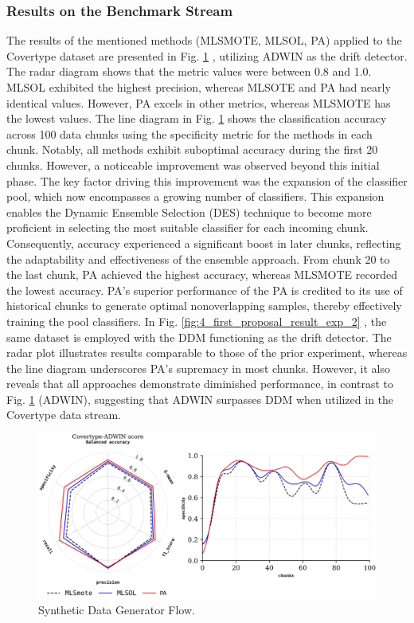 \subsubsection{Results on the Benchmark Stream}
The results of the mentioned methods (MLSMOTE, MLSOL, PA) applied to the Covertype dataset are presented in Fig. \ref{fig:4_first_proposal_result_exp_1}
, utilizing ADWIN as the drift detector. The radar diagram shows that the metric values were between 0.8 and 1.0. MLSOL exhibited the highest precision, whereas MLSOTE and PA had nearly identical values. However, PA excels in other metrics, whereas MLSMOTE has the lowest values. The line diagram in Fig. \ref{fig:4_first_proposal_result_exp_1}
shows the classification accuracy across 100 data chunks using the specificity metric for the methods in each chunk. Notably, all methods exhibit suboptimal accuracy during the first 20 chunks. However, a noticeable improvement was observed beyond this initial phase. The key factor driving this improvement was the expansion of the classifier pool, which now encompasses a growing number of classifiers. This expansion enables the Dynamic Ensemble Selection (DES) technique to become more proficient in selecting the most suitable classifier for each incoming chunk. Consequently, accuracy experienced a significant boost in later chunks, reflecting the adaptability and effectiveness of the ensemble approach. From chunk 20 to the last chunk, PA achieved the highest accuracy, whereas MLSMOTE recorded the lowest accuracy. PA's superior performance of the PA is credited to its use of historical chunks to generate optimal nonoverlapping samples, thereby effectively training the pool classifiers. In Fig. \ref{fig:4_first_proposal_result_exp_2}
, the same dataset is employed with the DDM functioning as the drift detector. The radar plot illustrates results comparable to those of the prior experiment, whereas the line diagram underscores PA's supremacy in most chunks. However, it also reveals that all approaches demonstrate diminished performance, in contrast to Fig. \ref{fig:4_first_proposal_result_exp_1} (ADWIN), suggesting that ADWIN surpasses DDM when utilized in the Covertype data stream.


\begin{figure}[!ht]
	\centering
	\includegraphics[width=1\linewidth]{4_Imbalanced/figures/exp_1.png}
	\caption{Synthetic Data Generator Flow.}
	\label{fig:4_first_proposal_result_exp_1}
\end{figure}

